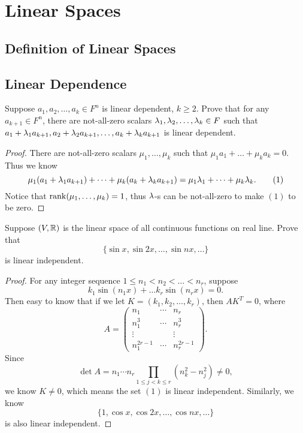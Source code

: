 \chapter{Linear Spaces}
\section{Definition of Linear Spaces}

\section{Linear Dependence}
\begin{pro}%
	Suppose $a_1,a_2,\dots,a_k\in F^n$ is linear dependent, $k\geq 2$. Prove that for any $a_{k+1}\in F^n$, there are not-all-zero scalars $\lambda_1,\lambda_2,\dots,\lambda_k\in F$ such that $a_1+\lambda_1a_{k+1},a_2+\lambda_2a_{k+1},\dots,a_k+\lambda_k a_{k+1}$ is linear dependent.
\end{pro}
\begin{proof}
	There are not-all-zero scalars $\mu_1,\dots,\mu_k$ such that $\mu_1 a_1+\dots+\mu_k a_k=0$. Thus we know
	\[\mu_1 (a_1+\lambda_1 a_{k+1})+\dots+\mu_k (a_k+\lambda_k a_{k+1})=\mu_1\lambda_1+\dots+\mu_k\lambda_k.\tag{1}\]
	Notice that $\operatorname*{rank}(\mu_1,\dots,\mu_k)=1$, thus $\lambda$-s can be not-all-zero to make $(1)$ to be zero.
\end{proof}

\begin{pro}%
	Suppose $(V,\mathbb{R})$ is the linear space of all continuous functions on real line. Prove that 
	\[\{\sin x,\sin 2x,\dots,\sin nx,\dots\}\tag{1}\]
	is linear independent.
\end{pro}
\begin{proof}
	For any integer sequence $1\leq n_1<n_2<\dots<n_r$, suppose 
	\[k_1\sin(n_1x)+\dots k_r\sin(n_r x)=0.\]
	Then easy to know that if we let $K=(k_1,k_2,\dots, k_r)$, then $AK^T=0$, where
	\[A=\begin{pmatrix}
	n_1 & \cdots & n_r\\
	n_1^3 & \cdots & n_r^3\\
	\vdots&  &\vdots\\
	n_1^{2r-1} & \cdots & n_r^{2r-1}\end{pmatrix}.\]
	Since 
	\[\det A=n_1\cdots n_r\prod_{1\leq j<k\leq r}(n_k^2-n_j^2)\neq 0,\]
	we know $K\neq 0$, which means the set $(1)$ is linear independent. Similarly, we know 
	\[\{1,\cos x,\cos 2x,\dots,\cos nx,\dots\}\]
	is also linear independent.
\end{proof}

